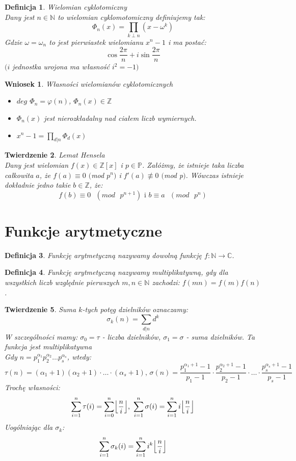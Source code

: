 \documentclass[10pt,a4paper]{article}
\newtheorem{theorem}{Twierdzenie}[section]
\newtheorem{corollary}{Wniosek}[theorem]
\newtheorem{defi}[theorem]{Definicja}
\newcommand{\N}{\mathbb{N}}
\newcommand{\Z}{\mathbb{Z}}
\newcommand{\p}{\mathbb{P}}
\newcommand{\C}{\mathbb{C}}
\begin{document}
\begin{defi}{Wielomian cyklotomiczny}
	\\ \color{black}
	Dany jest $n\in\N$ to wielomian cyklomotomiczny definiujemy tak:
	$$\Phi_n(x)=\prod_{k \perp n}(x-\omega^k)$$
	Gdzie $\omega=\omega_n$ to jest pierwiastek wielomianu $x^n-1$ i ma postać: 
	$$\cos{\frac{2\pi}{n}}+i\sin{\frac{2\pi}{n}}$$ $(i$ jednostka urojona ma własność $i^2=-1)$
\end{defi}
\begin{corollary}{Własności wielomianów cyklotomicznych}
    \color{black}
	\begin{itemize}
		\item $deg$ $\Phi_n=\varphi(n)$, $\Phi_n(x) \in \Z$
		\item $\Phi_n(x)$ jest nierozkładalny nad ciałem liczb wymiernych.
		\item $x^n-1=\prod_{d|n} \Phi_d(x)$
	\end{itemize}
\end{corollary}
\begin{theorem}{Lemat Hensela}
	\\
	\color{black}
	Dany jest wielomian $f(x) \in \Z[x]$ i $p \in \p$. Załóżmy, że istnieje taka liczba całkowita $a$, że $f(a) \equiv 0$ $($mod $p^n$$)$ i $f'(a) \not\equiv 0$ $($mod p$)$. Wówczas istnieje dokładnie jedno takie $b \in \Z$, że: 
	$$f(b) \equiv 0\textrm{ }(mod\textrm{ }p^{n+1})\textrm{ i } b \equiv a\textrm{ }(mod\textrm{ }p^{n})$$
\end{theorem}

\section{Funkcje arytmetyczne}
\begin{defi} \color{black} Funkcję arytmetyczną nazywamy dowolną funkcję $f:\N \longrightarrow \C$.
\end{defi}
\begin{defi} \color{black} Funkcję arytmetyczną nazywamy multiplikatywną, gdy dla wszystkich liczb względnie pierwszych $m,n \in \N$ zachodzi: $f(mn)=f(m)f(n)$.
\end{defi}
\begin{theorem}
	\color{black} Suma $k$-tych potęg dzielników oznaczamy:
	$$\sigma_k(n)=\sum_{d|n}d^k$$
	W szczególności mamy: $\sigma_0=\tau$ - liczba dzielników, $\sigma_1=\sigma$ - suma dzielników. Ta funkcja jest multiplikatywna
	\\ Gdy $n=p_1^{\alpha_1}p_2^{\alpha_2}\ldots p_s^{\alpha_s}$, wtedy:
	$$\tau(n)=(\alpha_1+1)(\alpha_2+1)\cdot \ldots \cdot(\alpha_s+1)\textrm{, } \sigma(n)=\frac{p_1^{\alpha_1+1}-1}{p_1-1}\cdot \frac{p_2^{\alpha_2+1}-1}{p_2-1}\cdot \ldots \cdot \frac{p_s^{\alpha_s+1}-1}{p_s-1}$$
	Trochę własności:
	$$\sum_{i=1}^{n} \tau(i)=\sum_{i=0}^{n} \Bigl\lfloor \frac{n}{i} \Bigr\rfloor \textrm{, } 
	\sum_{i=1}^{n}\sigma(i)=\sum_{i=1}^{n}i\Bigl\lfloor \frac{n}{i} \Bigr\rfloor$$
	Uogólniając dla $\sigma_k$:
	$$\sum_{i=1}^{n}\sigma_k(i)=\sum_{i=1}^{n}i^k\Bigl\lfloor \frac{n}{i} \Bigr\rfloor$$
\end{theorem}
\end{document}
